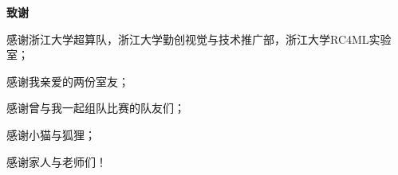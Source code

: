 \cleardoublepage{}
\begin{center}
    \bfseries {} 致谢
\end{center}

感谢浙江大学超算队，浙江大学勤创视觉与技术推广部，浙江大学RC4ML实验室；

感谢我亲爱的两份室友；

感谢曾与我一起组队比赛的队友们；

感谢小猫与狐狸；

感谢家人与老师们！